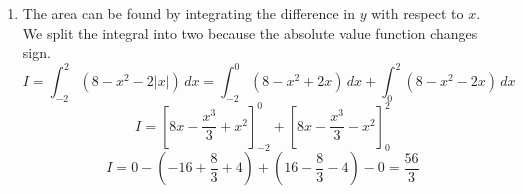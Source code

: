 \documentclass[a4paper, 12pt]{article}
\begin{document}
\begin{enumerate}[leftmargin=*,label=\textbf{\arabic*.}]
Take the first derivative with respect to time.
\begin{equation}f'(t)=\frac{1}{2\sqrt{x^2+y^2}}\cdot\left(2x\frac{dx}{dt}+2y\frac{dy}{dt}\right)\label{eq:14_15_fall_midterm_2}\end{equation}
\begin{equation}g'(t)=\frac{1}{2\sqrt{x^2-14x +49+y^2}}\cdot\left((2x-14)\frac{dx}{dt}+2y\frac{dy}{dt}\right)\label{eq:14_15_fall_midterm_3}\end{equation}

For $t=t_0$, given $x(t_0) = 4,\:y(t_0) = 3
,\:f(t_0) = \sqrt{4^2 +3^2} = 5,\text{ and }g(t_0) = \sqrt{3^2 + 3^2} = 3\sqrt{2}$. We then obtain a system of two equations by substituting values in \eqref{eq:14_15_fall_midterm_2} and \eqref{eq:14_15_fall_midterm_3}:
\[f'(t_0)=\frac{1}{10}\cdot\left(8\frac{dx}{dt}+6\frac{dy}{dt}\right)=\sqrt{2}\implies4x'(t_0)+3y'(t_0) = 5\sqrt{2}\]
\[g'(t_0)=\frac{1}{6\sqrt{2}}\cdot\left((-6)\frac{dx}{dt}+6\frac{dy}{dt}\right)=-3\implies-3x'(t_0)+3y'(t_0) = -9\sqrt{2} \]

The question asks us to find the change in the $x$-coordinate of P. Therefore, negate the latter equation and solve for $x'(t_0)$.
\[\boxed{x'(t_0) = 2\sqrt{2}}\]

\item \leavevmode
\vspace{-1em}
\begin{center}
\end{center}

The area can be found by integrating the difference in $y$ with respect to $x$. We split the integral into two because the absolute value function changes sign.
\[I=\int_{-2}^2(8-x^2-2|x|)\,dx=\int_{-2}^0(8-x^2+2x)\,dx+\int_{0}^2(8-x^2-2x)\,dx\]
\[I=\left[8x-\frac{x^3}{3}+x^2\right]_{-2}^0+\left[8x-\frac{x^3}{3}-x^2\right]_{0}^2\]
\[I=0-\left({-16}+\frac{8}{3}+4\right)+\left(16-\frac{8}{3}-4\right)-0=\boxed{\frac{56}{3}}\]
\end{enumerate}
\end{document}
